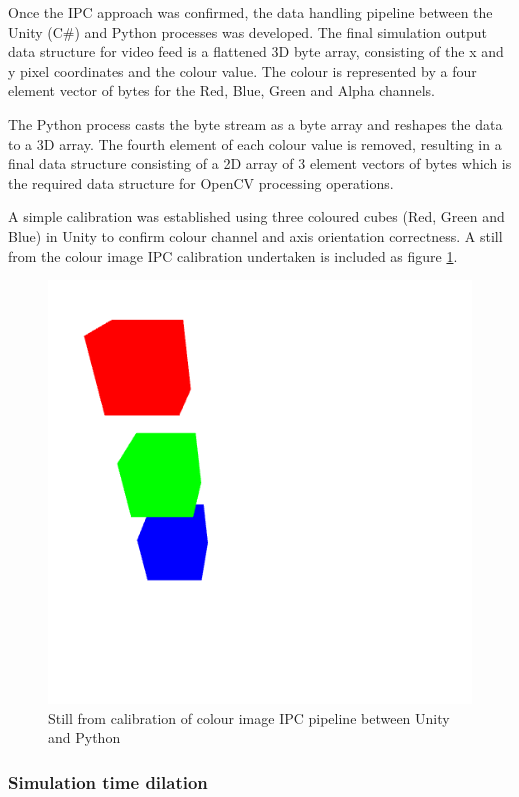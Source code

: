 \documentclass[]{aiaa-tc}%
\begin{document}
Once the IPC approach was confirmed, the data handling pipeline between the Unity (C\#) and Python processes was developed. The final simulation output data structure for video feed is a flattened 3D byte array, consisting of the x and y pixel coordinates and the colour value. The colour is represented by a four element vector of bytes for the Red, Blue, Green and Alpha channels. 

The Python process casts the byte stream as a byte array and reshapes the data to a 3D array. The fourth element of each colour value is removed, resulting in a final data structure consisting of a 2D array of 3 element vectors of bytes which is the required data structure for OpenCV processing operations. 

A simple calibration was established using three coloured cubes (Red, Green and Blue) in Unity to confirm colour channel and axis orientation correctness. A still from the colour image IPC calibration undertaken is included as figure \ref{f:unity_calibration}.


\begin{figure} %
	\centering
	\includegraphics[width=0.5\linewidth, height=0.5\linewidth]{unity_calibration.png}
	\caption{Still from calibration of colour image IPC pipeline between Unity and Python}
	\label{f:unity_calibration}
\end{figure}

\subsubsection{Simulation time dilation}\label{sect:timedilation}
\end{document}
